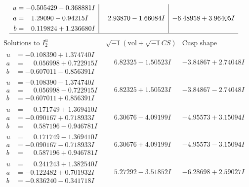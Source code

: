 \documentclass[1p]{elsarticle_modified}
\theoremstyle{definition}
\newcommand{\I}{\sqrt{-1}}
\begin{document}
$$\begin{array}{c|c|c}
\begin{aligned}
u &= -0.505429 - 0.368881 I \\
a &= \phantom{-}1.29090 - 0.94215 I \\
b &= \phantom{-}0.119824 + 1.236680 I\end{aligned}
 & \phantom{-}2.93870 - 1.66084 I & -6.48958 + 3.96405 I\\
 \hline 
 \end{array}$$\newpage$$\begin{array}{c|c|c}  
\text{Solutions to }I^u_{2}& \I (\text{vol} + \sqrt{-1}CS) & \text{Cusp shape}\\
 \hline 
\begin{aligned}
u &= -0.108390 + 1.374740 I \\
a &= \phantom{-}0.056998 + 0.722915 I \\
b &= -0.607011 - 0.856391 I\end{aligned}
 & \phantom{-}6.82325 - 1.50523 I & -3.84867 + 2.74048 I \\ \hline\begin{aligned}
u &= -0.108390 - 1.374740 I \\
a &= \phantom{-}0.056998 - 0.722915 I \\
b &= -0.607011 + 0.856391 I\end{aligned}
 & \phantom{-}6.82325 + 1.50523 I & -3.84867 - 2.74048 I \\ \hline\begin{aligned}
u &= \phantom{-}0.171749 + 1.369410 I \\
a &= -0.090167 + 0.718933 I \\
b &= \phantom{-}0.587196 - 0.946781 I\end{aligned}
 & \phantom{-}6.30676 - 4.09199 I & -4.95573 + 3.15094 I \\ \hline\begin{aligned}
u &= \phantom{-}0.171749 - 1.369410 I \\
a &= -0.090167 - 0.718933 I \\
b &= \phantom{-}0.587196 + 0.946781 I\end{aligned}
 & \phantom{-}6.30676 + 4.09199 I & -4.95573 - 3.15094 I \\ \hline\begin{aligned}
u &= \phantom{-}0.241243 + 1.382540 I \\
a &= -0.122482 + 0.701932 I \\
b &= -0.836240 - 0.341718 I\end{aligned}
 & \phantom{-}5.27292 - 3.51852 I & -6.28698 + 2.59027 I \\ \hline\begin{aligned}

\end{aligned}
\end{array}$$
\end{document}
